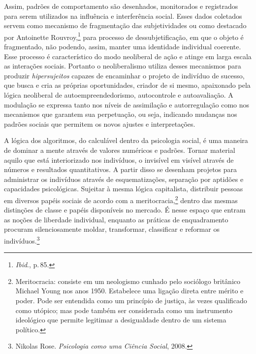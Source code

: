 Assim, padrões de comportamento são desenhados, monitorados e
registrados para serem utilizados na influência e interferência social.
Esses dados coletados servem como mecanismo de fragmentação das
subjetividades ou como destacado por Antoinette Rouvroy,\footnote{\textit{Ibid}., p.\,85.} para processo de dessubjetificação, em que o objeto é
fragmentado, não podendo, assim, manter uma identidade individual
coerente. Esse processo é característico do modo neoliberal de ação e
atinge em larga escala as interações sociais. Portanto o neoliberalismo
utiliza desses mecanismos para produzir \emph{hipersujeitos} capazes de
encaminhar o projeto de indivíduo de sucesso, que busca e cria as
próprias oportunidades, criador de si mesmo, apaixonado pela lógica
neoliberal de autoempreendedorismo, autocontrole e autoavaliação. A
modulação se expressa tanto nos níveis de assimilação e autorregulação
como nos mecanismos que garantem sua perpetuação, ou seja, indicando
mudanças nos padrões sociais que permitem os novos ajustes e
interpretações.

A lógica dos algoritmos, do calculável dentro da psicologia social, é
uma maneira de dominar a mente através de valores numéricos e padrões.
Tornar material aquilo que está interiorizado nos indivíduos, o
invisível em visível através de números e resultados quantitativos. A
partir disso se desenham projetos para administrar os indivíduos através
de esquematizações, separação por aptidões e capacidades psicológicas.
Sujeitar à mesma lógica capitalista, distribuir pessoas em diversos
papéis sociais de acordo com a meritocracia,\footnote{Meritocracia:
  consiste em um neologismo cunhado pelo sociólogo britânico Michael
  Young nos anos 1950. Estabelece uma ligação direta entre mérito e
  poder. Pode ser entendida como um princípio de justiça, às vezes
  qualificado como utópico; mas pode também ser considerada como um
  instrumento ideológico que permite legitimar a desigualdade dentro de
  um sistema político.} dentro das mesmas distinções de classe e papéis
disponíveis no mercado. É nesse espaço que entram as noções de liberdade
individual, enquanto as práticas de enquadramento procuram
silenciosamente moldar, transformar, classificar e reformar os
indivíduos.\footnote{Nikolas Rose. \emph{Psicologia como uma Ciência Social}, 2008.}

